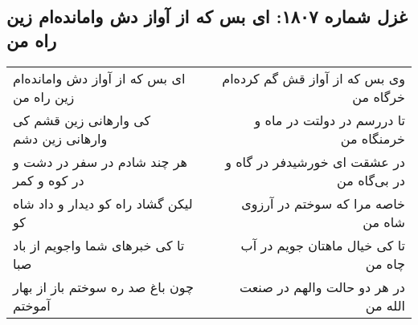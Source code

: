 \begin{center}
\section*{غزل شماره ۱۸۰۷: ای بس که از آواز دش وامانده‌ام زین راه من}
\label{sec:1807}
\begin{longtable}{l p{0.5cm} r}
ای بس که از آواز دش وامانده‌ام زین راه من
&&
وی بس که از آواز قش گم کرده‌ام خرگاه من
\\
کی وارهانی زین قشم کی وارهانی زین دشم
&&
تا دررسم در دولتت در ماه و خرمنگاه من
\\
هر چند شادم در سفر در دشت و در کوه و کمر
&&
در عشقت ای خورشیدفر در گاه و در بی‌گاه من
\\
لیکن گشاد راه کو دیدار و داد شاه کو
&&
خاصه مرا که سوختم در آرزوی شاه من
\\
تا کی خبرهای شما واجویم از باد صبا
&&
تا کی خیال ماهتان جویم در آب چاه من
\\
چون باغ صد ره سوختم باز از بهار آموختم
&&
در هر دو حالت والهم در صنعت الله من
\\
\end{longtable}
\end{center}
